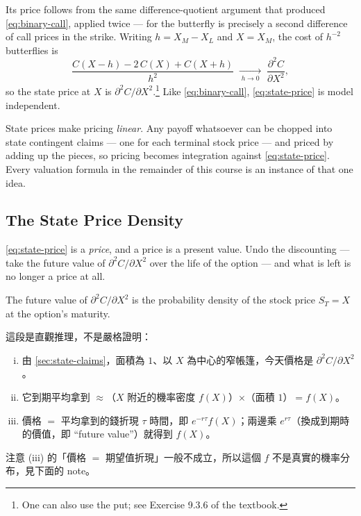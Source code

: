 Its price follows from the same difference-quotient argument that produced \eqref{eq:binary-call}, applied twice --- for the butterfly is precisely a second difference of call prices in the strike.
Writing $h=X_{M}-X_{L}$ and $X=X_{M}$, the cost of $h^{-2}$ butterflies is
\begin{equation}
	\frac{C(X-h)-2\,C(X)+C(X+h)}{h^{2}}
	\;\xrightarrow[\;h\to 0\;]{}\;
	\frac{\partial^{2}C}{\partial X^{2}} ,
	\label{eq:state-price}
\end{equation}
\suppend
so the state price at $X$ is $\partial^{2}C/\partial X^{2}$.\footnote{One can also use the put; see Exercise 9.3.6 of the textbook.}
Like \eqref{eq:binary-call}, \eqref{eq:state-price} is model independent.

\suppstart
\begin{moral}
	State prices make pricing \emph{linear}.
	Any payoff whatsoever can be chopped into state contingent claims --- one for each terminal stock price --- and priced by adding up the pieces, so pricing becomes integration against \eqref{eq:state-price}.
	Every valuation formula in the remainder of this course is an instance of that one idea.
\end{moral}
\suppend

\subsection{The State Price Density}
\label{sec:state-price-density}


\suppstart
\eqref{eq:state-price} is a \emph{price}, and a price is a present value.
Undo the discounting --- take the future value of $\partial^{2}C/\partial X^{2}$ over the life of the option --- and what is left is no longer a price at all.
\suppend

\begin{theorem}
	\label{thm:breeden-litzenberger}
	The future value of $\partial^{2}C/\partial X^{2}$ is the probability density of the stock price $S_{T}=X$ at the option's maturity.
\end{theorem}

\suppstart
\begin{remark}
	這段是直觀推理，不是嚴格證明：
	\begin{enumerate}[(i),nosep]
		\item 由 \autoref{sec:state-claims}，面積為 $1$、以 $X$ 為中心的窄帳篷，今天價格是 $\partial^{2}C/\partial X^{2}$。
		\item 它到期平均拿到 $\approx$（$X$ 附近的機率密度 $f(X)$）$\times$（面積 $1$）$=f(X)$。
		\item 價格 $=$ 平均拿到的錢折現 $\tau$ 時間，即 $e^{-r\tau}f(X)$；兩邊乘 $e^{r\tau}$（換成到期時的價值，即 ``future value''）就得到 $f(X)$。
	\end{enumerate}
	注意 (iii) 的「價格 $=$ 期望值折現」一般不成立，所以這個 $f$ 不是真實的機率分布，見下面的 note。
\end{remark}

